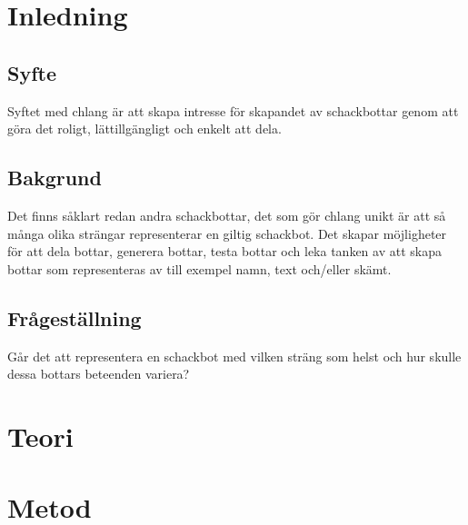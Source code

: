 \documentclass{article}
\begin{document}
	\section{Inledning}

	\subsection{Syfte}
	Syftet med chlang är att skapa intresse för skapandet av schackbottar genom att göra det roligt, lättillgängligt och enkelt att dela.
	
	\subsection{Bakgrund}
	Det finns såklart redan andra schackbottar, det som gör chlang unikt är att så många olika strängar representerar en giltig schackbot. Det skapar möjligheter för att dela bottar, generera bottar, testa bottar och leka tanken av att skapa bottar som representeras av till exempel namn, text och/eller skämt.
	
	\subsection{Frågeställning}
	Går det att representera en schackbot med vilken sträng som helst och hur skulle dessa bottars beteenden variera?

	\newpage
	\section{Teori}
	
	

	\newpage
	\section{Metod}
\end{document}
